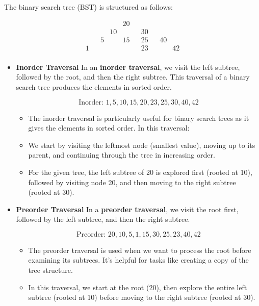 \begin{example}
    The binary search tree (BST) is structured as follows:

    \[
    \begin{array}{cccccccccc}
        & & & & 20 & & & & \\
        & & & 10 & & & 30 & & \\
        & & 5 & & 15 & & 25 & & 40 \\
        1 & & & & & & 23 & & & 42 \\
    \end{array}
    \]

    \begin{itemize}
        \item \textbf{Inorder Traversal}
        In an \textbf{inorder traversal}, we visit the left subtree, followed by the root, and then the right subtree. This traversal of a binary search tree produces the elements in sorted order.
        
        \[
        \text{Inorder: } 1, 5, 10, 15, 20, 23, 25, 30, 40, 42
        \]
        \begin{itemize}
            \item The inorder traversal is particularly useful for binary search trees as it gives the elements in sorted order. In this traversal:
            \item We start by visiting the leftmost node (smallest value), moving up to its parent, and continuing through the tree in increasing order.
            \item For the given tree, the left subtree of 20 is explored first (rooted at 10), followed by visiting node 20, and then moving to the right subtree (rooted at 30).
        \end{itemize}
        
        \item \textbf{Preorder Traversal}
        In a \textbf{preorder traversal}, we visit the root first, followed by the left subtree, and then the right subtree.
        
        \[
        \text{Preorder: } 20, 10, 5, 1, 15, 30, 25, 23, 40, 42
        \]
        \begin{itemize}
            \item The preorder traversal is used when we want to process the root before examining its subtrees. It's helpful for tasks like creating a copy of the tree structure.
            \item In this traversal, we start at the root (20), then explore the entire left subtree (rooted at 10) before moving to the right subtree (rooted at 30).
        \end{itemize}
        

\end{itemize}
\end{example}
